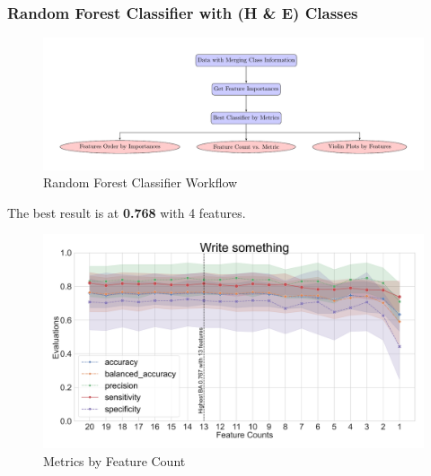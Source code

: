 \documentclass{beamer}
\begin{document}
    \begin{frame}[allowframebreaks]
        \frametitle{Random Forest Classifier with (H \& E) Classes}

        \begin{figure}
            \includegraphics[width=0.8 \linewidth]{figures/RandomForest/merge.pdf}
            \caption{Random Forest Classifier Workflow}
        \end{figure}

        The best result is at \textbf{0.768} with 4 features.

        \begin{figure}
            \includegraphics[width=0.8 \linewidth]{figures/RandomForest/HE.DADA2.homd/metrics.png}
            \caption{Metrics by Feature Count}
        \end{figure}


\end{frame}
\end{document}

